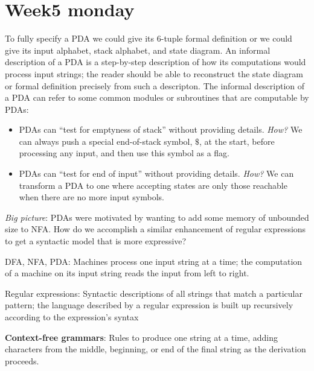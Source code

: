 \documentclass[12pt, oneside]{article}
\begin{document}
\begin{flushright}
\end{flushright} \section*{Week5 monday}


To fully specify a PDA we could give its $6$-tuple formal definition or we could give its input 
alphabet, stack alphabet, and state diagram.
An informal description of a PDA is a step-by-step description of how its computations 
would process input strings; the reader should be able to reconstruct the state diagram or formal 
definition precisely from such a descripton. The informal description of a PDA can refer to some 
common modules or subroutines that are computable by PDAs:
\begin{itemize}
  \item PDAs can ``test for emptyness of stack'' without providing details. 
  {\it How?} We can always push a special end-of-stack symbol, $\$$, at the start, before processing
  any input, and then use this symbol as a flag.
  \item PDAs can ``test for end of input'' without providing details.
  {\it How?} We can transform a PDA to one where accepting states are only those reachable 
  when there are no more input symbols.
\end{itemize}

{\it Big picture}: PDAs were motivated by wanting to add some memory of unbounded size to NFA. How 
do we accomplish a similar enhancement of regular expressions to get a syntactic model that is 
more expressive?

DFA, NFA, PDA: Machines process one input string at a time; the computation of a machine on its input string 
reads the input from left to right.

Regular expressions: Syntactic descriptions of all strings that match a particular pattern; the language 
described by a regular expression is built up recursively according to the expression's syntax

{\bf Context-free grammars}: Rules to produce one string at a time, adding characters from the middle, beginning, 
or end of the final string as the derivation proceeds.
\end{document}
